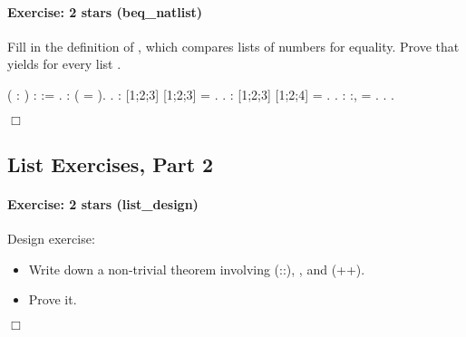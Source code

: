 \documentclass[12pt]{report}
\begin{document}
\paragraph{Exercise: 2 stars (beq\_natlist)}

 Fill in the definition of , which compares
    lists of numbers for equality.  Prove that   
    yields  for every list . \begin{coqdoccode}
\coqdocemptyline
\coqdocnoindent
{}  (  : ) :  :=\coqdoceol
\coqdocindent{1.00em}
 .\coqdoceol
\coqdocemptyline
\coqdocnoindent
{}  :   (   = ).\coqdoceol
 .\coqdoceol
\coqdocnoindent
{}  :    [1;2;3] [1;2;3] = .\coqdoceol
 .\coqdoceol
\coqdocnoindent
{}  :    [1;2;3] [1;2;4] = .\coqdoceol
 .\coqdoceol
\coqdocemptyline
\coqdocnoindent
{}  : \coqdockw{\ensuremath{\forall}} :,\coqdoceol
\coqdocindent{1.00em}
 =   .\coqdoceol
\coqdocnoindent
{}.\coqdoceol
 .\coqdoceol
\end{coqdoccode}
\ensuremath{\Box} \begin{coqdoccode}
\coqdocemptyline
\end{coqdoccode}
\subsection{List Exercises, Part 2}



\paragraph{Exercise: 2 stars (list\_design)}

 Design exercise: 



\begin{itemize}
\item  Write down a non-trivial theorem 
       involving  (::), , and  (++).  

\item  Prove it. 
\end{itemize}
\begin{coqdoccode}
\coqdocemptyline
\end{coqdoccode}
\ensuremath{\Box} 
\end{document}
